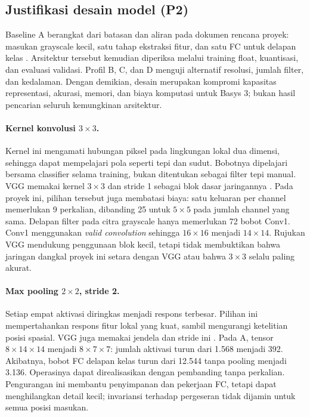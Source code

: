 \documentclass[11pt,a4paper]{article}
\begin{document}
\subsection{Justifikasi desain model (P2)}
Baseline A berangkat dari batasan dan aliran pada dokumen rencana proyek:
masukan grayscale kecil, satu tahap ekstraksi fitur, dan satu FC untuk delapan
kelas \cite{repo}. Arsitektur tersebut kemudian diperiksa melalui training
float, kuantisasi, dan evaluasi validasi. Profil B, C, dan D menguji alternatif
resolusi, jumlah filter, dan kedalaman. Dengan demikian, desain merupakan
kompromi kapasitas representasi, akurasi, memori, dan biaya komputasi untuk
Basys 3; bukan hasil pencarian seluruh kemungkinan arsitektur.

\paragraph{Kernel konvolusi $3\times3$.}
Kernel ini mengamati hubungan piksel pada lingkungan lokal dua dimensi,
sehingga dapat mempelajari pola seperti tepi dan sudut. Bobotnya dipelajari
bersama classifier selama training, bukan ditentukan sebagai filter tepi
manual. VGG memakai kernel $3\times3$ dan stride 1 sebagai blok dasar
jaringannya \cite{vgg}. Pada proyek ini, pilihan tersebut juga membatasi biaya:
satu keluaran per channel memerlukan 9 perkalian, dibanding 25 untuk
$5\times5$ pada jumlah channel yang sama. Delapan filter pada citra grayscale
hanya memerlukan 72 bobot Conv1. Conv1 menggunakan \textit{valid convolution}
sehingga $16\times16$ menjadi $14\times14$. Rujukan VGG mendukung penggunaan
blok kecil, tetapi tidak membuktikan bahwa jaringan dangkal proyek ini setara
dengan VGG atau bahwa $3\times3$ selalu paling akurat.

\paragraph{Max pooling $2\times2$, stride 2.}
Setiap empat aktivasi diringkas menjadi respons terbesar. Pilihan ini
mempertahankan respons fitur lokal yang kuat, sambil mengurangi ketelitian
posisi spasial. VGG juga memakai jendela dan stride ini \cite{vgg}.
Pada A, tensor $8\times14\times14$ menjadi $8\times7\times7$:
jumlah aktivasi turun dari 1.568 menjadi 392. Akibatnya, bobot FC delapan
kelas turun dari 12.544 tanpa pooling menjadi 3.136. Operasinya dapat
direalisasikan dengan pembanding tanpa perkalian. Pengurangan ini membantu
penyimpanan dan pekerjaan FC, tetapi dapat menghilangkan detail kecil;
invariansi terhadap pergeseran tidak dijamin untuk semua posisi masukan.
\end{document}
